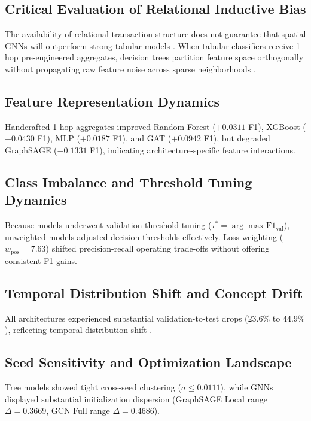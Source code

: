 \documentclass[conference]{IEEEtran}
\begin{document}
\subsection{Critical Evaluation of Relational Inductive Bias}
The availability of relational transaction structure does not guarantee that spatial GNNs will outperform strong tabular models \cite{bronstein2017geometric, wang2021graph}. When tabular classifiers receive 1-hop pre-engineered aggregates, decision trees partition feature space orthogonally without propagating raw feature noise across sparse neighborhoods \cite{breiman2001random, chen2016xgboost, grinsztajn2022why}.

\subsection{Feature Representation Dynamics}
Handcrafted 1-hop aggregates improved Random Forest ($+0.0311$ F1), XGBoost ($+0.0430$ F1), MLP ($+0.0187$ F1), and GAT ($+0.0942$ F1), but degraded GraphSAGE ($-0.1331$ F1), indicating architecture-specific feature interactions.

\subsection{Class Imbalance and Threshold Tuning Dynamics}
Because models underwent validation threshold tuning ($\tau^* = \arg\max \text{F1}_{\text{val}}$), unweighted models adjusted decision thresholds effectively. Loss weighting ($w_{\text{pos}} = 7.63$) shifted precision-recall operating trade-offs without offering consistent F1 gains.

\subsection{Temporal Distribution Shift and Concept Drift}
All architectures experienced substantial validation-to-test drops ($23.6\%$ to $44.9\%$), reflecting temporal distribution shift \cite{gama2014survey, quinonero2009dataset}.

\subsection{Seed Sensitivity and Optimization Landscape}
Tree models showed tight cross-seed clustering ($\sigma \le 0.0111$), while GNNs displayed substantial initialization dispersion (GraphSAGE Local range $\Delta = 0.3669$, GCN Full range $\Delta = 0.4686$).
\end{document}
